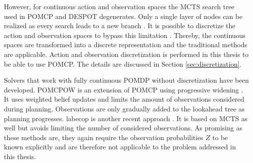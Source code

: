 However, for continuous action and observation spaces the MCTS search tree used in POMCP and DESPOT degenerates. Only a single layer of nodes can be realized as every search leads to a new branch \parencite{online_pomdp_cont}. It is possible to discretize the action and observation spaces to bypass this limitation \parencite{pomcp_continuous}. Thereby, the continuous spaces are transformed into a discrete representation and the traditional methods are applicable. Action and observation discretization is performed in this thesis to be able to use POMCP. The details are discussed in Section \ref{sec:discretization}.

Solvers that work with fully continuous POMDP without discretization have been developed. POMCPOW is an extension of POMCP using progressive widening \parencite{online_pomdp_cont}. It uses weighted belief updates
and limits the amount of observations considered during planning. Observations are only gradually added to the lookahead tree as planning progresses. \gls{labecop} is another recent approach \parencite{online-cont-pomdp-2}. It is based on MCTS as well but avoids limiting the number of considered observations. As promising as these methods are, they again require the observation probabilities $Z$ to be known explicitly and are therefore not applicable to the problem addressed in this thesis.








